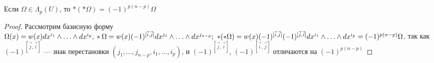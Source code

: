 \begin{prop}
	Если $\Omega\in\Lambda_p(U)$, то $*(*\Omega)=(-1)^{p(n-p)}\Omega$
\end{prop}

\begin{proof}
	Рассмотрим базисную форму $\Omega(x)=w(x)dx^{i_1}\wedge\ldots\wedge dx^{i_p},\\ *\Omega=w(x)(-1)^{[\vec{i},\vec{j}]}dx^{j_1}\wedge\ldots\wedge dx^{j_{n-p}};\ *(*\Omega)=w(x)(-1)^{[\vec{i},\vec{j}]}(-1)^{[\vec{j},\vec{i}]}dx^{i_1}\wedge\ldots\wedge dx^{i_p}=(-1)^{p(n-p)}\Omega$, так как $(-1)^{[\vec{j}, \vec{i}]}$ --- знак перестановки $(j_1, \ldots, j_{n-p}, i_1, \ldots, i_p)$, и $(-1)^{[\vec{j}, \vec{i}]}$, $(-1)^{[\vec{i}, \vec{j}]}$ отличаются на $(-1)^{p(n-p)}$
\end{proof}





